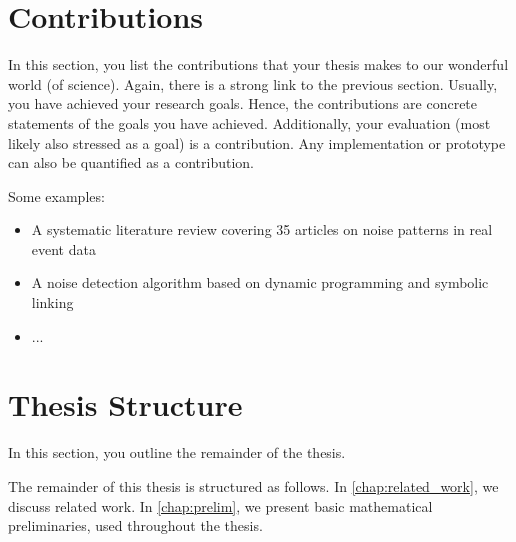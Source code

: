 \section{Contributions}

In this section, you list the contributions that your thesis makes to our wonderful world (of science).
Again, there is a strong link to the previous section.
Usually, you have achieved your research goals.
Hence, the contributions are concrete statements of the goals you have achieved.
Additionally, your evaluation (most likely also stressed as a goal) is a contribution.
Any implementation or prototype can also be quantified as a contribution.

Some examples:
\begin{itemize}
	\item A systematic literature review covering 35 articles on noise patterns in real event data
	\item A noise detection algorithm based on dynamic programming and symbolic linking
	\item ...
\end{itemize}

\section{Thesis Structure}
In this section, you outline the remainder of the thesis.

The remainder of this thesis is structured as follows.
In \cref{chap:related_work}, we discuss related work.
In \cref{chap:prelim}, we present basic mathematical preliminaries, used throughout the thesis.

